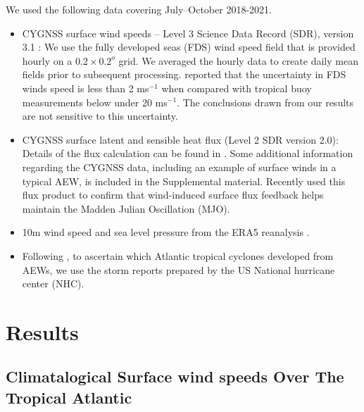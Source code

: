 \documentclass[draft]{agujournal2019}
\begin{document}
We used the following data covering July--October 2018-2021. 
\begin{itemize}
\item CYGNSS surface wind speeds -- Level 3 Science Data Record (SDR), version 3.1 \cite{2016BAMS}: We use the fully developed seas (FDS) wind speed field that is provided hourly on a $0.2 \times 0.2^o$ grid. We averaged the hourly data to create daily mean fields prior to subsequent processing.  reported that the  uncertainty in FDS winds speed is less than  2 ms$^{-1}$ when compared with tropical buoy measurements below under 20 ms$^{-1}$. The conclusions drawn from our results are not sensitive to this uncertainty.

\item CYGNSS surface latent and sensible heat flux (Level 2 SDR version 2.0): Details of the flux calculation can be found in . Some additional information regarding the CYGNSS data, including an example of surface winds in a typical AEW, is included in the Supplemental material. Recently  used this flux product to confirm that wind-induced surface flux feedback helps maintain the Madden Julian Oscillation (MJO). 

\item 10m wind speed and sea level pressure from the ERA5 reanalysis \cite{era5}.

\item Following , to ascertain which Atlantic tropical cyclones developed from AEWs, we use the storm reports prepared by the US National hurricane center (NHC). 

\end{itemize}


\section{Results}


\subsection{Climatalogical Surface wind speeds Over The Tropical Atlantic}
\end{document}
